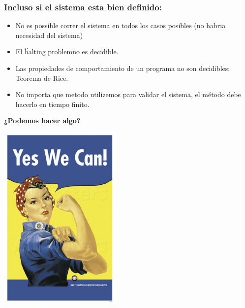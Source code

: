 \documentclass{beamer}
\begin{document}
\begin{frame}
    \frametitle{Incluso si el sistema esta bien definido:}
    \begin{itemize}
        \item{No es possible correr el sistema en todos
            los casos posibles (no habria necesidad del sistema)}
        \item{El \"halting problem\" no es decidible.}
        \item{Las propiedades de comportamiento de un programa no
            son decidibles: Teorema de Rice.}
        \item{No importa que metodo utilizemos para validar el sistema,
            el m\'etodo debe hacerlo en tiempo finito.}
    \end{itemize}
    {\bf ¿Podemos hacer algo?}
\end{frame}

\begin{frame}
    \begin{center}
    \includegraphics[width=6cm]{yes.jpg}
    \end{center}
\end{frame}
\end{document}
